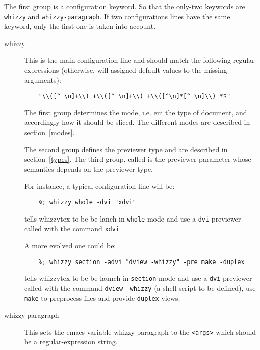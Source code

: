 \documentclass{article}
\let \lst \verb
\let \whizzy \WhizzyTeX
\begin{document}
The first group is a configuration keyword. 
So that the only-two  keywords are \lst"whizzy" and 
\lst"whizzy-paragraph". If two configurations
lines have the same keyword, only the first one is taken into
account.
\begin{description}
\item[whizzy]
This is the main configuration line and should match the following regular
expressions (otherwise, {\whizzy} will assigned default values to the
missing arguments): 
\begin{verbatim}
    "\\([^ \n]+\\) +\\([^ \n]+\\) +\\([^\n]*[^ \n]\\) *$"
\end{verbatim}
The first group determines the mode, {\i.e. em} the type of document, and
accordingly how it should be sliced.  The different modes are described in
section~\ref {modes}.

The second group defines the previewer type and are described in
section~\ref{types}.  The third group, called is the previewer parameter
whose semantics depends on the previewer type.

For instance, a typical configuration line will be:
\begin{verbatim}
    %; whizzy whole -dvi "xdvi"
\end{verbatim}
tells whizzytex to be be lanch in \lst"whole" mode and use a \lst"dvi"
previewer called with the command \lst"xdvi"

A more evolved one could be:
\begin{verbatim}
    %; whizzy section -advi "dview -whizzy" -pre make -duplex
\end{verbatim}
tells whizzytex to be be launch in \lst"section" mode and use a \lst"dvi"
previewer called with the command \lst"dview -whizzy" (a shell-script to be defined), use \lst"make" to
preprocess files and provide \lst"duplex" views.

\item[whizzy-paragraph]
This sets the emacs-variable whizzy-paragraph to the \lst"<args>"
which should be a regular-expression string. 
\end{description} 


\end{document}
